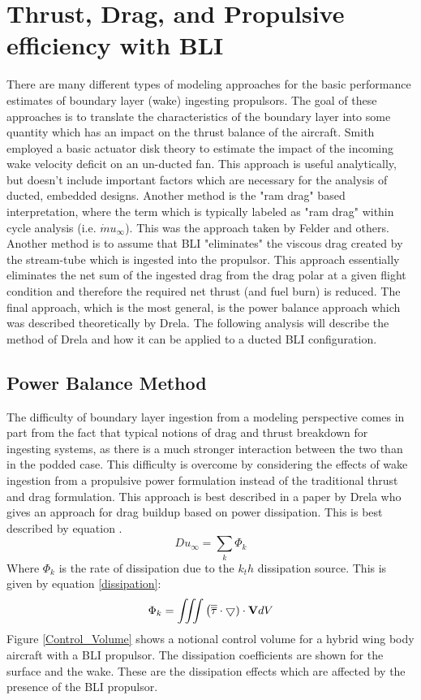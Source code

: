 \documentclass[12pt]{gatech-thesis}
\begin{document}
\section{Thrust, Drag, and Propulsive efficiency with BLI}
\indent There are many different types of modeling approaches for the basic performance estimates of boundary layer (wake) ingesting propulsors.  The goal of these approaches is to translate the characteristics of the boundary layer into some quantity which has an impact on the thrust balance of the aircraft.  Smith employed a basic actuator disk theory to estimate the impact of the incoming wake velocity deficit on an un-ducted fan.  This approach is useful analytically, but doesn't include important factors which are necessary for the analysis of ducted, embedded designs.  Another method is the "ram drag" based interpretation, where the term which is typically labeled as "ram drag" within cycle analysis (i.e. $\dot{m}u_\infty$).  This was the approach taken by Felder and others.  Another method is to assume that BLI "eliminates" the viscous drag created by the stream-tube which is ingested into the propulsor.  This approach essentially eliminates the net sum of the ingested drag from the drag polar at a given flight condition and therefore the required net thrust (and fuel burn) is reduced.  The final approach, which is the most general, is the power balance approach which was described theoretically by Drela.  The following analysis will describe the method of Drela and how it can be applied to a ducted BLI configuration.  

\subsection{Power Balance Method}

\indent The difficulty of boundary layer ingestion from a modeling perspective comes in part from the fact that typical notions of drag and thrust breakdown for ingesting systems, as there is a much stronger interaction between the two than in the podded case.  This difficulty is overcome by considering the effects of wake ingestion from a propulsive power formulation instead of the traditional thrust and drag formulation.  This approach is best described in a paper by Drela \cite{Drela2009} who gives an approach for drag buildup based on power dissipation.  This is best described by equation \cite{Drela2009}.
   \begin{equation}Du_\infty = \displaystyle\sum_{k}\Phi_k \label{DragBuild}\end{equation}%
   Where $\Phi_k$ is the rate of dissipation due to the $k_th$ dissipation source.  This is given by equation \ref{dissipation}:
   \begin{equation} \Phi_k = \iiint{\big(\overline{\overline{\tau}} \cdot \bigtriangledown) \cdot \bold{V} dV}\label{dissipation}\end{equation}
Figure \ref{Control_Volume} shows a notional control volume for a hybrid wing body aircraft with a BLI propulsor.  The dissipation coefficients are shown for the surface and the wake.  These are the dissipation effects which are affected by the presence of the BLI propulsor.  
\end{document}
